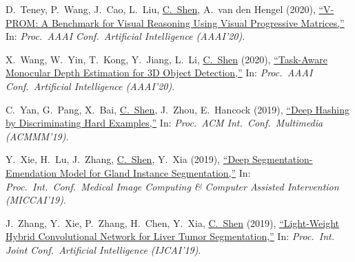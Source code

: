 \documentclass[9pt, a4paper]{article}
\newcommand{\years}[1]{\marginnote{\scriptsize #1}}
\def\highlight{\uline}
\begin{document}
\medskip

\years{2020} D.~Teney, P.~Wang, J.~Cao, L.~Liu, \highlight{C.~Shen}, A.~van den Hengel (2020),
\href{http://www.google.com/search?lr=&ie=UTF-8&oe=UTF-8&q=V-PROM%3A+A+Benchmark+for+Visual+Reasoning+Using+Visual+Progressive+Matrices+Damien+Teney%2C+Peng+Wang%2C+Jiewei+Cao%2C+Lingqiao+Liu%2C+Chunhua+Shen%2C+Anton+van+den+Hengel}{``{V-PROM}: A Benchmark for Visual Reasoning Using Visual Progressive Matrices,{}''}
In: \emph{Proc.\ AAAI Conf.\  Artificial Intelligence (AAAI'20)}.

\medskip

\years{2020} X.~Wang, W.~Yin, T.~Kong, Y.~Jiang, L.~Li, \highlight{C.~Shen} (2020),
\href{http://www.google.com/search?lr=&ie=UTF-8&oe=UTF-8&q=Task-Aware+Monocular+Depth+Estimation+for+3D+Object+Detection+Xinlong+Wang%2C+Wei+Yin%2C+Tao+Kong%2C+Yuning+Jiang%2C+Lei+Li%2C+Chunhua+Shen}{``Task-Aware Monocular Depth Estimation for {3D} Object Detection,{}''}
In: \emph{Proc.\ AAAI Conf.\  Artificial Intelligence (AAAI'20)}.

\medskip

\years{2019} C.~Yan, G.~Pang, X.~Bai, \highlight{C.~Shen}, J.~Zhou, E.~Hancock (2019),
\href{http://www.google.com/search?lr=&ie=UTF-8&oe=UTF-8&q=Deep+Hashing+by+Discriminating+Hard+Examples+Cheng+Yan%2C+Guansong+Pang%2C+Xiao+Bai%2C+Chunhua+Shen%2C+Jun+Zhou%2C+Edwin+Hancock}{``Deep Hashing by Discriminating Hard Examples,{}''}
In: \emph{Proc.\ ACM Int.\ Conf.\  Multimedia (ACMMM'19)}.

\medskip

\years{2019} Y.~Xie, H.~Lu, J.~Zhang, \highlight{C.~Shen}, Y.~Xia (2019),
\href{http://www.google.com/search?lr=&ie=UTF-8&oe=UTF-8&q=Deep+Segmentation-Emendation+Model+for+Gland+Instance+Segmentation+Yutong+Xie%2C+Hao+Lu%2C+Jianpeng+Zhang%2C+Chunhua+Shen%2C+Yong+Xia}{``Deep Segmentation-Emendation Model for Gland Instance Segmentation,{}''}
In: \emph{Proc.\ Int.\ Conf.\  Medical Image Computing \& Computer Assisted Intervention (MICCAI'19)}.

\medskip

\years{2019} J.~Zhang, Y.~Xie, P.~Zhang, H.~Chen, Y.~Xia, \highlight{C.~Shen} (2019),
\href{http://www.google.com/search?lr=&ie=UTF-8&oe=UTF-8&q=Light-Weight+Hybrid+Convolutional+Network+for+Liver+Tumor+Segmentation+Jianpeng+Zhang%2C+Yutong+Xie%2C+Pingping+Zhang%2C+Hao+Chen%2C+Yong+Xia%2C+Chunhua+Shen}{``Light-Weight Hybrid Convolutional Network for Liver Tumor Segmentation,{}''}
In: \emph{Proc.\ Int. Joint Conf.\  Artificial Intelligence (IJCAI'19)}.
\end{document}
